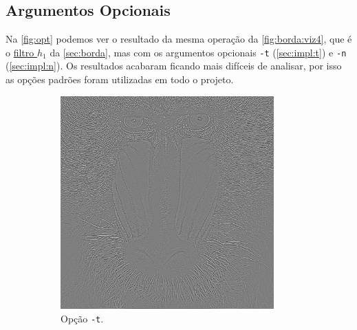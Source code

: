 \subsection{Argumentos Opcionais}

    Na \cref{fig:opt} podemos ver o resultado da mesma operação da \cref{fig:borda:viz4}, que é o \hyperref[fig:h1]{filtro $h_1$} da \cref{sec:borda}, mas com os argumentos opcionais \texttt{-t} (\cref{sec:impl:t}) e \texttt{-n} (\cref{sec:impl:n}). Os resultados acabaram ficando mais difíceis de analisar, por isso as opções padrões foram utilizadas em todo o projeto.

    \begin{figure}[H]
        \centering
        \begin{subfigure}{0.48\textwidth}
            \centering
            \includegraphics[width=0.9\textwidth]{resultados/baboon_h1t.png}
            \caption{Opção \texttt{-t}.}
            \label{fig:opt:t}
        \end{subfigure}%
        \begin{subfigure}{0.48\textwidth}
            \centering

\end{subfigure}
\end{figure}
